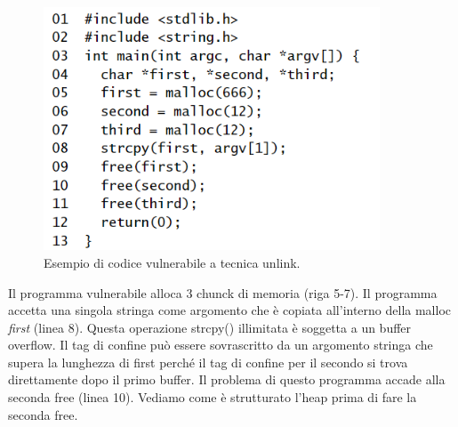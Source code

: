 \begin{figure}[H]
    \centering
    \includegraphics[width=10cm, keepaspectratio]{capitoli/secure_coding/img/cap_4/unlink_buff_over.png}
    \caption{Esempio di codice vulnerabile a tecnica unlink.}\label{fig:ulink_buff_over}
\end{figure}

Il programma vulnerabile alloca 3 chunck di memoria (riga 5-7). Il programma accetta una singola stringa come argomento che è copiata all'interno della malloc \textit{first} (linea 8). Questa operazione strcpy() illimitata è soggetta a un buffer overflow. Il tag di confine può essere sovrascritto da un argomento stringa che supera la lunghezza di first perché il tag di confine per il secondo si trova direttamente dopo il primo buffer. Il problema di questo programma accade alla seconda free (linea 10). Vediamo come è strutturato l'heap prima di fare la seconda free.

